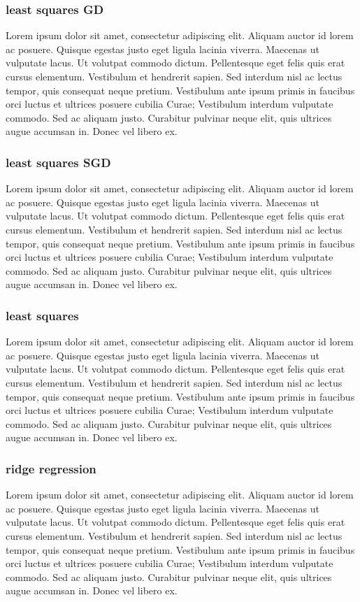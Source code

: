\documentclass[11pt,a4paper]{article}
\begin{document}
\subsubsection{least squares GD}
Lorem ipsum dolor sit amet, consectetur adipiscing elit. Aliquam auctor id lorem ac posuere. Quisque egestas justo eget ligula lacinia viverra. Maecenas ut vulputate lacus. Ut volutpat commodo dictum. Pellentesque eget felis quis erat cursus elementum. Vestibulum et hendrerit sapien. Sed interdum nisl ac lectus tempor, quis consequat neque pretium. Vestibulum ante ipsum primis in faucibus orci luctus et ultrices posuere cubilia Curae; Vestibulum interdum vulputate commodo. Sed ac aliquam justo. Curabitur pulvinar neque elit, quis ultrices augue accumsan in. Donec vel libero ex.

\subsubsection{least squares SGD}
Lorem ipsum dolor sit amet, consectetur adipiscing elit. Aliquam auctor id lorem ac posuere. Quisque egestas justo eget ligula lacinia viverra. Maecenas ut vulputate lacus. Ut volutpat commodo dictum. Pellentesque eget felis quis erat cursus elementum. Vestibulum et hendrerit sapien. Sed interdum nisl ac lectus tempor, quis consequat neque pretium. Vestibulum ante ipsum primis in faucibus orci luctus et ultrices posuere cubilia Curae; Vestibulum interdum vulputate commodo. Sed ac aliquam justo. Curabitur pulvinar neque elit, quis ultrices augue accumsan in. Donec vel libero ex. 

\subsubsection{least squares}
Lorem ipsum dolor sit amet, consectetur adipiscing elit. Aliquam auctor id lorem ac posuere. Quisque egestas justo eget ligula lacinia viverra. Maecenas ut vulputate lacus. Ut volutpat commodo dictum. Pellentesque eget felis quis erat cursus elementum. Vestibulum et hendrerit sapien. Sed interdum nisl ac lectus tempor, quis consequat neque pretium. Vestibulum ante ipsum primis in faucibus orci luctus et ultrices posuere cubilia Curae; Vestibulum interdum vulputate commodo. Sed ac aliquam justo. Curabitur pulvinar neque elit, quis ultrices augue accumsan in. Donec vel libero ex. 

\subsubsection{ridge regression}
Lorem ipsum dolor sit amet, consectetur adipiscing elit. Aliquam auctor id lorem ac posuere. Quisque egestas justo eget ligula lacinia viverra. Maecenas ut vulputate lacus. Ut volutpat commodo dictum. Pellentesque eget felis quis erat cursus elementum. Vestibulum et hendrerit sapien. Sed interdum nisl ac lectus tempor, quis consequat neque pretium. Vestibulum ante ipsum primis in faucibus orci luctus et ultrices posuere cubilia Curae; Vestibulum interdum vulputate commodo. Sed ac aliquam justo. Curabitur pulvinar neque elit, quis ultrices augue accumsan in. Donec vel libero ex. 
\end{document}
